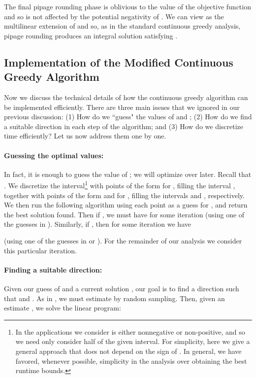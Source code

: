 \documentclass{article}
\theoremstyle{definition}
\begin{document}
The final pipage rounding phase is oblivious to the value of the objective function and so is not affected by the potential negativity of .  We can view  as the multilinear extension of  and so, as in the standard continuous greedy analysis, pipage rounding produces an integral solution  satisfying .

\subsection{Implementation of the Modified Continuous Greedy Algorithm}

Now we discuss the technical details of how the continuous greedy algorithm can be implemented efficiently.
There are three main issues that we ignored in our previous discussion: (1) How do we ``guess" the values of  and ; 
(2) How do we find a suitable direction  in each step of the algorithm; and 
(3) How do we discretize time efficiently?  Let us now address them one by one.

\paragraph{Guessing the optimal values:}
In fact, it is enough to guess the value of ; we will optimize over  later.  
Recall that .  We discretize the interval\footnote{In the applications we consider  is either nonnegative or non-positive, and so we need only consider half of the given interval.  For simplicity, here we give a general approach that does not depend on the sign of .  In general, we have favored, whenever possible, simplicity in the analysis over obtaining the best runtime bounds.}  with  points of the form  for , filling the interval , together with  points of the form  and  for , filling the intervals  and , respectively.  We then run the following algorithm using each point as a guess for , and return the best solution found.  Then if , we must have  
 for some iteration (using one of the guesses in ).  Similarly, if , then for some iteration we have

(using one of the guesses in  or ).  For the remainder of our analysis we consider this particular iteration.

\paragraph{Finding a suitable direction:}
Given our guess of  and a current solution , our goal is to find a direction  such that
 and .  As in \cite{Calinescu2011}, we must estimate  by random sampling.   Then, given an estimate , we solve the linear program:
\end{document}
